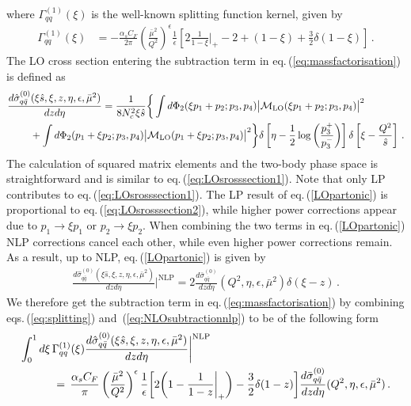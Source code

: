 \documentclass[11pt]{article}
\newcommand{\nn}{\nonumber}
\newcommand\eqn[1]     {eq.\,(\ref{#1})}
\newcommand\eqns[2]    {eqs.\,(\ref{#1}) and~(\ref{#2})}
\begin{document}
where $\Gamma_{qq}^{(1)}(\xi)$ is the 
well-known splitting function kernel, 
given by
%
\begin{align}\label{eq:splitting}
    \Gamma_{qq}^{(1)}(\xi)&= -\frac{\alpha_sC_F}{2\pi}\left(\frac{\bar\mu^2}{Q^2}\right)^{\epsilon}\frac{1}{\epsilon}\left[2\frac{1}{1-\xi}\bigg|_+-2+(1-\xi)+\frac{3}{2}\delta(1-\xi)\right]\,.
\end{align}
%
The LO cross section entering the subtraction 
term in \eqn{eq:massfactorisation} is defined as
\begin{align} \label{LOpartonic}
   \frac{d\hat{\sigma}_{q\bar{q}}^{(0)}(\xi\hat{s},\xi,z,\eta,\epsilon,\bar\mu^2)}{dzd\eta} &= \frac{1}{8N_c^2\xi \hat{s}}\bigg\{\int d\Phi_2(\xi p_1+p_2;p_3,p_4)
   \big|\mathcal{M}_\text{LO}(\xi p_1+p_2;p_3,p_4)\big|^2 \nonumber \\ 
   &\hspace{-2.5cm}+ \int d\Phi_2(p_1+\xi p_2;p_3,p_4)\big|\mathcal{M}_\text{LO}(p_1+\xi p_2;p_3,p_4)\big|^2\bigg\}  \delta\left[\eta-\frac12\log\left(\frac{p_3^+}{p_3^-}\right)\right]\delta\left[\xi-\frac{Q^2}{\hat{s}}\right] \,.
\end{align}
%
The calculation of squared matrix elements and the 
two-body phase space is straightforward and is 
similar to \eqn{eq:LOsrosssection1}. Note that 
only LP contributes to \eqn{eq:LOsrosssection1}. 
The LP result of \eqn{LOpartonic} is proportional to \eqn{eq:LOsrosssection2}, while higher power 
corrections appear due to $p_1\to \xi p_1$ or 
$p_2\to \xi p_2$. When combining the two terms in 
\eqn{LOpartonic} NLP corrections cancel each 
other, while even higher power corrections 
remain. As a result, up to NLP, \eqn{LOpartonic} 
is given by
\begin{align}\label{eq:NLOsubtractionnlp}
   \frac{d\hat{\sigma}_{q\bar{q}}^{(0)}(\xi\hat{s},\xi,z,\eta,\epsilon,\bar\mu^2)}{dzd\eta}\bigg|^{\text{NLP}} =2\frac{d\bar{\sigma}^{(0)}_{q\bar{q}}}{dzd\eta}(Q^2,\eta,\epsilon,\bar\mu^2)\delta(\xi-z) \,.
\end{align}
We therefore get the subtraction term in 
\eqn{eq:massfactorisation} by combining 
\eqns{eq:splitting}{eq:NLOsubtractionnlp} 
to be of the following form
\begin{align}\label{eq:subtractionterm}
\int_0^1d\xi\,\Gamma_{qq}^{(1)}(\xi)\frac{d\hat{\sigma}_{q\bar{q}}^{(0)}(\xi\hat{s},\xi,z,\eta,\epsilon,\bar\mu^2)}{dzd\eta}\bigg|^{\text{NLP}} & 
\nn \\ 
&\hspace{-5.0cm}=\,\frac{\alpha_sC_F}{\pi}\left(\frac{\bar\mu^2}{Q^2}\right)^{\epsilon}\frac{1}{\epsilon}\bigg[ 2 \bigg( 1-\frac{1}{1-z}\bigg|_+ \bigg) -\frac{3}{2}\delta(1-z)\bigg]\frac{d\bar{\sigma}^{{(0)}}_{q\bar{q}}}{dzd\eta}(Q^2,\eta,\epsilon,\bar\mu^2) \,.
\end{align}
\end{document}
